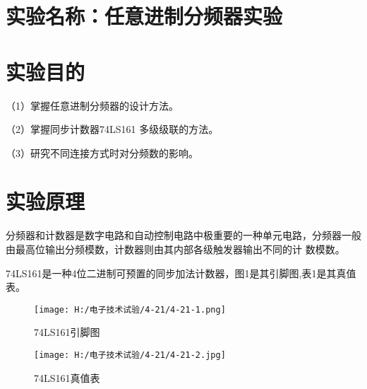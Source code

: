 \documentclass{article}
\begin{document}
	\section{ 实验名称：任意进制分频器实验}
    \section{ 实验目的}
     （1）掌握任意进制分频器的设计方法。\par
               （2）掌握同步计数器74LS161 多级级联的方法。\par 
               （3）研究不同连接方式时对分频数的影响。\par
   	\section{ 实验原理}
       分频器和计数器是数字电路和自动控制电路中极重要的一种单元电路，分频器一般由最高位输出分频模数，计数器则由其内部各级触发器输出不同的计
       数模数。\par
       74LS161是一种4位二进制可预置的同步加法计数器，图1是其引脚图,表1是其真值表。
       
       \begin{figure}[h]
        \centering
        \texttt{[image: H:/电子技术试验/4-21/4-21-1.png]}
        \caption{74LS161引脚图} \label{fig:aa}
        \end{figure}
       
       
        \begin{figure}[h]
            \centering
            \texttt{[image: H:/电子技术试验/4-21/4-21-2.jpg]}
            \caption{74LS161真值表} \label{fig:aa}
            \end{figure}
\end{document}
